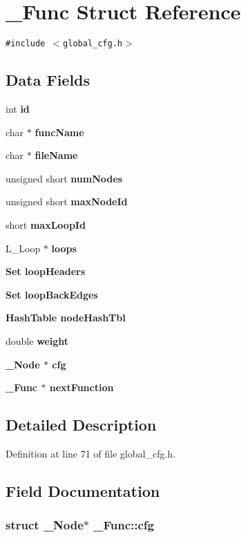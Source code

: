 \section{\_\-Func Struct Reference}
\label{struct__Func}
{\tt \#include $<$global\_\-cfg.h$>$}

\subsection*{Data Fields}
\begin{CompactItemize}
\item 
int \bf{id}
\item 
char $\ast$ \bf{func\-Name}
\item 
char $\ast$ \bf{file\-Name}
\item 
unsigned short \bf{num\-Nodes}
\item 
unsigned short \bf{max\-Node\-Id}
\item 
short \bf{max\-Loop\-Id}
\item 
L\_\-Loop $\ast$ \bf{loops}
\item 
\bf{Set} \bf{loop\-Headers}
\item 
\bf{Set} \bf{loop\-Back\-Edges}
\item 
\bf{Hash\-Table} \bf{node\-Hash\-Tbl}
\item 
double \bf{weight}
\item 
\bf{\_\-Node} $\ast$ \bf{cfg}
\item 
\bf{\_\-Func} $\ast$ \bf{next\-Function}
\end{CompactItemize}


\subsection{Detailed Description}




Definition at line 71 of file global\_\-cfg.h.

\subsection{Field Documentation}
\subsubsection{\setlength{\rightskip}{0pt plus 5cm}struct \bf{\_\-Node}$\ast$ \bf{\_\-Func::cfg}}\label{struct__Func_bbc09be5e66c554c47cea5be9336c2e5}




